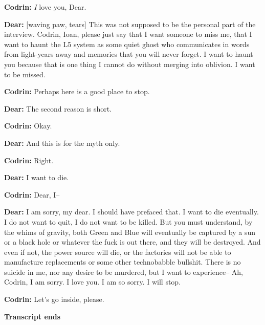 \textbf{Codrin:} \emph{I} love you, Dear.

\textbf{Dear:} {[}waving paw, tears{]} This was not supposed to be the personal part of the interview. Codrin, Ioan, please just say that I want someone to miss me, that I want to haunt the L5 system as some quiet ghost who communicates in words from light-years away and memories that you will never forget. I want to haunt you because that is one thing I cannot do without merging into oblivion. I want to be missed.

\textbf{Codrin:} Perhaps here is a good place to stop.

\textbf{Dear:} The second reason is short.

\textbf{Codrin:} Okay.

\textbf{Dear:} And this is for the myth only.

\textbf{Codrin:} Right.

\textbf{Dear:} I want to die.

\textbf{Codrin:} Dear, I--

\textbf{Dear:} I am sorry, my dear. I should have prefaced that. I want to die eventually. I do not want to quit, I do not want to be killed. But you must understand, by the whims of gravity, both Green and Blue will eventually be captured by a sun or a black hole or whatever the fuck is out there, and they will be destroyed. And even if not, the power source will die, or the factories will not be able to manufacture replacements or some other technobabble bullshit. There is no suicide in me, nor any desire to be murdered, but I want to experience-- Ah, Codrin, I am sorry. I love you. I am so sorry. I will stop.

\textbf{Codrin:} Let's go inside, please.

\textbf{Transcript ends}
